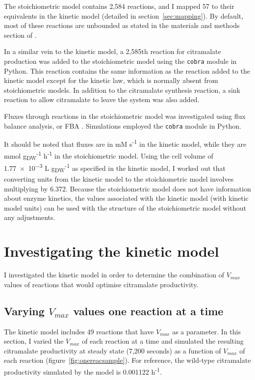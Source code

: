 \documentclass[parskip=full, numbers=noenddot]{scrreprt}
\begin{document}
The stoichiometric model contains 2,584 reactions, and I mapped 57 to their equivalents in the kinetic model (detailed in section~\ref{sec:mapping}). By default, most of these reactions are unbounded as stated in the materials and methods section of \citet{orth_comprehensive_2011}.

In a similar vein to the kinetic model, a 2,585th reaction for citramalate production was added to the stoichiometric model using the \texttt{cobra} module in Python. This reaction contains the same information as the reaction added to the kinetic model except for the kinetic law, which is normally absent from stoichiometric models. In addition to the citramalate synthesis reaction, a sink reaction to allow citramalate to leave the system was also added.

Fluxes through reactions in the stoichiometric model was investigated using flux balance analysis, or FBA \citep{orth_what_2010}. Simulations employed the \texttt{cobra} module in Python.

It should be noted that fluxes are in mM s\textsuperscript{-1} in the kinetic model, while they are mmol g\textsubscript{DW}\textsuperscript{-1} h\textsuperscript{-1} in the stoichiometric model. Using the cell volume of \num{1.77e-3} L g\textsubscript{DW}\textsuperscript{-1} as specified in the kinetic model, I worked out that converting units from the kinetic model to the stoichiometric model involves multiplying by 6.372. Because the stoichiometric model does not have information about enzyme kinetics, the values associated with the kinetic model (with kinetic model units) can be used with the structure of the stoichiometric model without any adjustments.

\chapter{Investigating the kinetic model}
\label{ch:kinetic}

I investigated the kinetic model in order to determine the combination of $V_{max}$ values of reactions that would optimise citramalate productivity.

\section{Varying $V_{max}$ values one reaction at a time}
\label{sec:onereac}

The kinetic model includes 49 reactions that have $V_{max}$ as a parameter. In this section, I varied the $V_{max}$ of each reaction at a time and simulated the resulting citramalate productivity at steady state (7,200 seconds) as a function of $V_{max}$ of each reaction (figure~\ref{fig:onereacsample}).
For reference, the wild-type citramalate productivity simulated by the model is 0.001122 h\textsuperscript{-1}.
\end{document}
